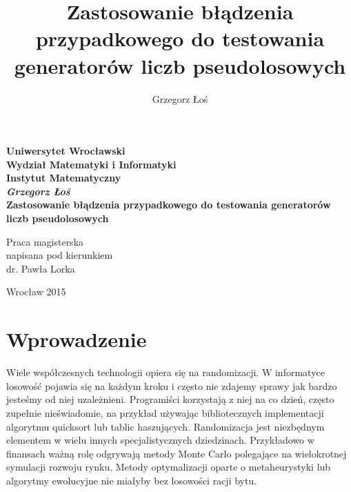 \documentclass[a4paper,11pt,twoside]{book}
\title{Zastosowanie błądzenia przypadkowego do testowania generatorów liczb pseudolosowych}
\author{Grzegorz Łoś}
\theoremstyle{definition}
\begin{document}
\thispagestyle{empty}
\begin{center}
\textbf{\large Uniwersytet Wrocławski\\
Wydział Matematyki i Informatyki\\
Instytut Matematyczny}\\
\vspace{4cm}
\textbf{\textit{\large Grzegorz Łoś}\\
\vspace{0.5cm}
{\Large Zastosowanie błądzenia przypadkowego do testowania generatorów liczb pseudolosowych}}\\
\end{center}
\vspace{3cm}
{\large \hspace*{6.5cm}Praca magisterska\\
\hspace*{6.5cm}napisana pod kierunkiem\\
\hspace*{6.5cm}dr. Pawła Lorka }\\
\vfill
\begin{center}
{\large Wrocław 2015}\\
\end{center}

\newpage
\thispagestyle{empty}
\begin{minipage}{0.5\linewidth}
\end{minipage}

\newpage


\begin{minipage}{0.8\linewidth}
\tableofcontents
\end{minipage}

\chapter*{Wprowadzenie}
Wiele współczesnych technologii opiera się na randomizacji. W informatyce losowość pojawia się na każdym kroku i często nie zdajemy sprawy jak bardzo jesteśmy od niej uzależnieni. Programiści korzystają z niej na co dzień, często zupełnie nieświadomie, na przykład używając bibliotecznych implementacji algorytmu quicksort lub tablic haszujących. Randomizacja jest niezbędnym elementem w wielu innych specjalistycznych dziedzinach. Przykładowo w finansach ważną rolę odgrywają metody Monte Carlo polegające na wielokrotnej symulacji rozwoju rynku. Metody optymalizacji oparte o metaheurystyki lub algorytmy ewolucyjne nie miałyby bez losowości racji bytu.
\end{document}
